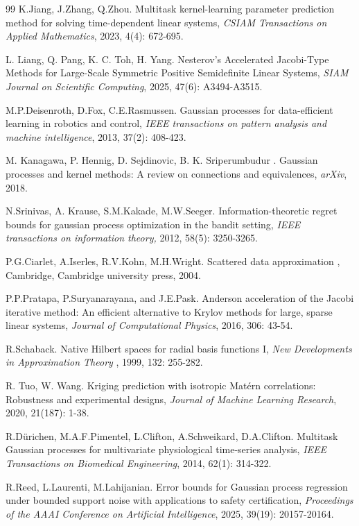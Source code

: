 \documentclass[preprint,review,sort&compress,3p]{elsarticle}
\begin{document}
\begin{thebibliography}{99}
K.Jiang, J.Zhang, Q.Zhou.
Multitask kernel-learning parameter prediction method for solving time-dependent linear systems,
{\it CSIAM Transactions on Applied Mathematics}, 
2023, 4(4): 672-695.

{ 
L. Liang, Q. Pang, K. C. Toh, H. Yang. 
Nesterov's Accelerated Jacobi-Type Methods for Large-Scale Symmetric Positive Semidefinite Linear Systems, 
{\it SIAM Journal on Scientific Computing}, 
2025, 47(6): A3494-A3515.
}

M.P.Deisenroth, D.Fox, C.E.Rasmussen.
Gaussian processes for data-efficient learning in robotics and control,
{\it IEEE transactions on pattern analysis and machine intelligence}, 
2013, 37(2): 408-423.

M. Kanagawa, P. Hennig, D. Sejdinovic, B. K. Sriperumbudur{ .} Gaussian processes and kernel
methods: A review on connections and equivalences,
{\it arXiv},
2018. 

N.Srinivas, A. Krause, S.M.Kakade, M.W.Seeger.
Information-theoretic regret bounds for gaussian process optimization in the bandit setting,
{\it   IEEE transactions on information theory,}
2012, 58(5): 3250-3265.

P.G.Ciarlet, A.Iserles, R.V.Kohn, M.H.Wright.
Scattered data approximation{ ,}
Cambridge, Cambridge university press, 2004.

P.P.Pratapa, P.Suryanarayana, and J.E.Pask.
Anderson acceleration of the Jacobi iterative method: An efficient alternative to Krylov methods for large, sparse linear systems,
{\it Journal of Computational Physics}, 2016, 306: 43-54.


R.Schaback.
Native Hilbert spaces for radial basis functions I,
{\it New Developments in Approximation Theory }, 
1999, 132: 255-282.

R. Tuo, W. Wang. 
Kriging prediction with isotropic Mat\'ern correlations: Robustness and experimental designs,
{\it Journal of Machine Learning Research}, 
2020, 21(187): 1-38.

R.D\"{u}richen, M.A.F.Pimentel, L.Clifton, A.Schweikard, D.A.Clifton.
Multitask Gaussian processes for multivariate physiological time-series analysis,
{\it IEEE Transactions on Biomedical Engineering}, 
2014, 62(1): 314-322.

R.Reed, L.Laurenti, M.Lahijanian.
Error bounds for Gaussian process regression under bounded support noise with applications to safety certification,
{\it Proceedings of the AAAI Conference on Artificial Intelligence},
2025, 39(19): 20157-20164.


\end{thebibliography}
\end{document}
